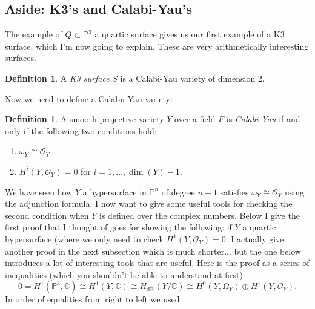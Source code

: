\documentclass[12pt]{article}
\numberwithin{equation}{section}
\theoremstyle{definition}
\newtheorem{definition}[theorem]{Definition}
\theoremstyle{remark}
\newcommand{\CC}{\mathbb{C}}
\newcommand{\Ocal}{\mathcal{O}}
\newcommand{\PP}{\mathbb{P}}
\newcommand{\dR}{\operatorname{dR}}
\begin{document}
\subsection{Aside: K3's and Calabi-Yau's}
The example of $Q\subset \PP^3$ a quartic surface gives us our first example of a K3 surface, which I'm now going to explain. 
These are very arithmetically interesting surfaces. 
\begin{definition}
	A \emph{K3 surface} $S$ is a Calabi-Yau variety of dimension 2. 
\end{definition}
Now we need to define a Calabu-Yau variety:
\begin{definition}
	A smooth projective variety $Y$ over a field $F$ is \emph{Calabi-Yau} if and only if the following two conditions hold:
	\begin{enumerate}
		\item $\omega_Y \cong \Ocal_Y$
		\item $H^i(Y,\Ocal_Y)=0$ for $i=1,\ldots,\dim(Y)-1$.
	\end{enumerate} 
\end{definition}
We have seen how $Y$ a hypersurface in $\PP^n$ of degree $n+1$ satisfies $\omega_Y\cong \Ocal_Y$ using the adjunction formula. 
I now want to give some useful tools for checking the second condition when $Y$ is defined over the complex numbers. 
Below I give the first proof that I thought of goes for showing the following: if $Y$ a quartic hypersurface (where we only need to check $H^1(Y,\Ocal_Y)=0$. I actually give another proof in the next subsection which is much shorter... but the one below introduces a lot of interesting tools that are useful.
Here is the proof as a series of inequalities (which you shouldn't be able to understand at first):
\begin{equation}
 0=H^1(\PP^3,\CC) \cong H^1(Y,\CC) \cong H^1_{\dR}(Y/\CC) \cong H^0(Y,\Omega_Y) \oplus H^1(Y,\Ocal_Y).
\end{equation}
In order of equalities from right to left we used:
\end{document}
